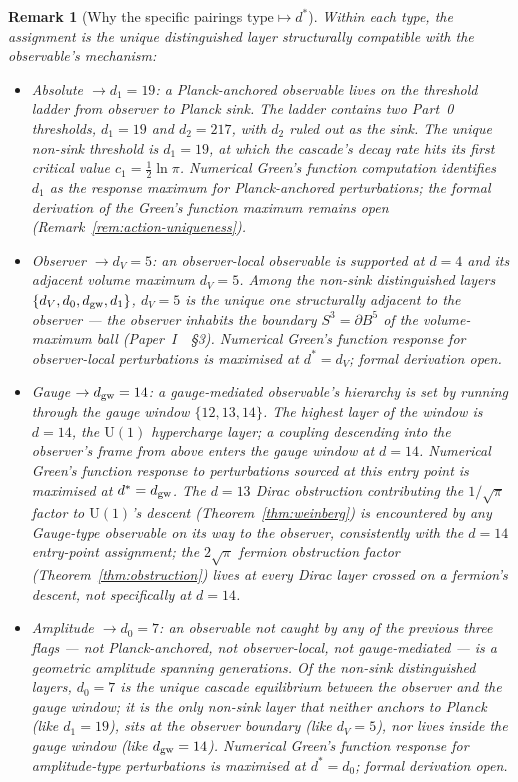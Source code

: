 \documentclass[12pt,a4paper]{article}
\newtheorem*{remark}{Remark}
\begin{document}
\begin{remark}[Why the specific pairings $\text{type}\mapsto d^*$]
Within each type, the assignment is the unique distinguished layer structurally compatible with the observable's mechanism:
\begin{itemize}
\item \emph{Absolute $\to d_1=19$}: a Planck-anchored observable lives on the threshold ladder from observer to Planck sink. The ladder contains two Part~0 thresholds, $d_1=19$ and $d_2=217$, with $d_2$ ruled out as the sink. The unique non-sink threshold is $d_1=19$, at which the cascade's decay rate hits its first critical value $c_1=\tfrac12\ln\pi$. Numerical Green's function computation identifies $d_1$ as the response maximum for Planck-anchored perturbations; the formal derivation of the Green's function maximum remains open (Remark~\ref{rem:action-uniqueness}).
\item \emph{Observer $\to d_V=5$}: an observer-local observable is supported at $d=4$ and its adjacent volume maximum $d_V=5$. Among the non-sink distinguished layers $\{d_V,d_0,d_{\rm gw},d_1\}$, $d_V=5$ is the unique one structurally adjacent to the observer --- the observer inhabits the boundary $S^3 = \partial B^5$ of the volume-maximum ball (Paper~I~\cite{part0}~\S3). Numerical Green's function response for observer-local perturbations is maximised at $d^*=d_V$; formal derivation open.
\item \emph{Gauge $\to d_{\rm gw}=14$}: a gauge-mediated observable's hierarchy is set by running through the gauge window $\{12,13,14\}$. The highest layer of the window is $d=14$, the $\mathrm{U}(1)$ hypercharge layer; a coupling descending into the observer's frame from above enters the gauge window at $d=14$. Numerical Green's function response to perturbations sourced at this entry point is maximised at $d^*=d_{\rm gw}$. The $d=13$ Dirac obstruction contributing the $1/\sqrt{\pi}$ factor to $\mathrm{U}(1)$'s descent (Theorem~\ref{thm:weinberg}) is encountered by any Gauge-type observable on its way to the observer, consistently with the $d=14$ entry-point assignment; the $2\sqrt{\pi}$ fermion obstruction factor (Theorem~\ref{thm:obstruction}) lives at every Dirac layer crossed on a fermion's descent, not specifically at $d=14$.
\item \emph{Amplitude $\to d_0=7$}: an observable not caught by any of the previous three flags --- not Planck-anchored, not observer-local, not gauge-mediated --- is a geometric amplitude spanning generations. Of the non-sink distinguished layers, $d_0=7$ is the unique cascade equilibrium between the observer and the gauge window; it is the only non-sink layer that neither anchors to Planck (like $d_1=19$), sits at the observer boundary (like $d_V=5$), nor lives inside the gauge window (like $d_{\rm gw}=14$). Numerical Green's function response for amplitude-type perturbations is maximised at $d^*=d_0$; formal derivation open.

\end{itemize}
\end{remark}
\end{document}
